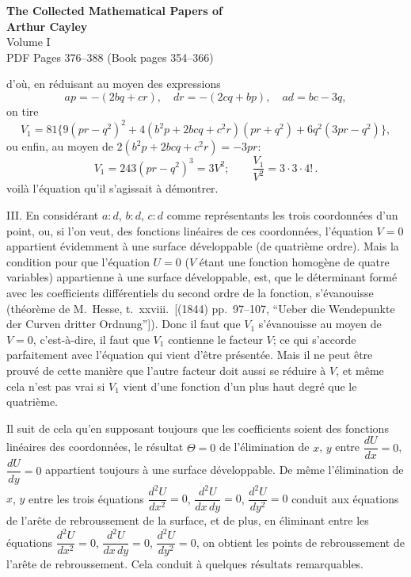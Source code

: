 \documentclass[11pt]{article}
\begin{document}
\begin{center}
{\LARGE\bfseries The Collected Mathematical Papers of}\\[0.5em]
{\LARGE\bfseries Arthur Cayley}\\[1em]
{\Large Volume I}\\[1em]
{\large PDF Pages 376--388 \quad (Book pages 354--366)}\\[2em]
\end{center}

\bigskip


\noindent d'o\`u, en r\'eduisant au moyen des expressions
\[
a p = -(2 b q + c r), \quad d r = -(2 c q + b p), \quad a d = b c - 3 q,
\]
on tire
\[
V_{1} = 81 \{9 (p r - q^{2})^{2} + 4 (b^{2} p + 2 b c q + c^{2} r)(p r + q^{2}) + 6 q^{2}(3 p r - q^{2})\},
\]
ou enfin, au moyen de $2 (b^{2} p + 2 b c q + c^{2} r) = - 3 p r$:
\[
V_{1} = 243 (p r - q^{2})^{3} = 3 V^{2}; \qquad \frac{V_{1}}{V^{2}} = 3 \cdot 3 \cdot 4!\, .
\]
voil\`a l'\'equation qu'il s'agissait \`a d\'emontrer.

\medskip
\noindent\textsc{III.} En consid\'erant $a : d$, $b : d$, $c : d$ comme repr\'esentants les trois coordonn\'ees
d'un point, ou, si l'on veut, des fonctions lin\'eaires de ces coordonn\'ees, l'\'equation $V = 0$
appartient \'evidemment \`a une surface d\'eveloppable (de quatri\`eme ordre). Mais la condi\-tion
pour que l'\'equation $U = 0$ ($V$ \'etant une fonction homog\`ene de quatre variables)
appartienne \`a une surface d\'eveloppable, est, que le d\'eterminant form\'e avec les coefficients
diff\'erentiels du second ordre de la fonction, s'\'evanouisse (th\'eor\`eme de M.~Hesse,
t.~xxviii.\ [(1844) pp.~97--107, ``Ueber die Wendepunkte der Curven dritter Ordnung'']).
Donc il faut que $V_{1}$ s'\'evanouisse au moyen de $V = 0$, c'est-\`a-dire, il faut que $V_{1}$ contienne
le facteur $V$; ce qui s'accorde parfaitement avec l'\'equation qui vient d'\^etre pr\'esent\'ee.
Mais il ne peut \^etre prouv\'e de cette mani\`ere que l'autre facteur doit aussi se r\'eduire \`a
$V$, et m\^eme cela n'est pas vrai si $V_{1}$ vient d'une fonction d'un plus haut degr\'e que le
quatri\`eme.

\medskip
Il suit de cela qu'en supposant toujours que les coefficients soient des fonctions
lin\'eaires des coordonn\'ees, le r\'esultat $\Theta = 0$ de l'\'elimination de $x$, $y$ entre $\dfrac{d U}{d x} = 0$, $\dfrac{d U}{d y} = 0$
appartient toujours \`a une surface d\'eveloppable. De m\^eme l'\'elimination de $x$, $y$ entre les
trois \'equations $\dfrac{d^{2} U}{d x^{2}} = 0$, $\dfrac{d^{2} U}{d x\, d y} = 0$, $\dfrac{d^{2} U}{d y^{2}} = 0$ conduit aux \'equations de l'ar\^ete de rebrousse\-ment
de la surface, et de plus, en \'eliminant entre les \'equations
$\dfrac{d^{2} U}{d x^{2}} = 0$, $\dfrac{d^{2} U}{d x\, d y} = 0$, $\dfrac{d^{2} U}{d y^{2}} = 0$,
on obtient les points de rebroussement de l'ar\^ete de rebroussement.
Cela conduit \`a quelques r\'esultats remarquables.
\end{document}
